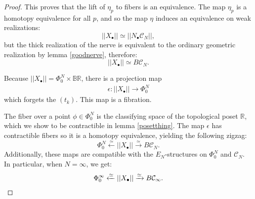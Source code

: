 \documentclass[10pt,a4paper]{amsart}
\newcommand{\C}{\mathcal{C}}
\DeclareMathOperator{\Conf}{Conf}
\DeclareMathOperator{\UConf}{UConf}
\begin{document}
\begin{proof}
This proves that the lift of $\eta_p$ to fibers is an equivalence.
The map $\eta_p$ is a homotopy equivalence for all $p$, and so the map $\eta$ induces an equivalence on weak realizations:
\[\vert\vert X_\bullet\vert\vert \simeq \vert\vert N_\bullet\C_N\vert\vert,\]
but the thick realization of the nerve is equivalent to the ordinary geometric realization by lemma \ref{goodnerve}, therefore:
\[\vert\vert X_\bullet\vert\vert \simeq B\C_N.\]

Because $\vert\vert X_\bullet\vert\vert = \Phi_0^N\times \mathbb{B}\mathbb{R}$, there is a projection map 
\begin{align}
\epsilon: \vert\vert X_\bullet\vert\vert\rightarrow \Phi_0^N 
\end{align}
which forgets the $(t_k)$.
This map is a fibration.

The fiber over a point $\phi\in\Phi_0^N$ is the classifying space of the topological poset $\mathbb{R}$, which we show to be contractible in lemma \ref{posetthing}.
The map $\epsilon$ has contractible fibers so it is a homotopy equivalence, yielding the following zigzag:
\[\Phi_0^N\xleftarrow{\simeq}\vert\vert X_\bullet\vert\vert \xrightarrow{\simeq} B\C_N.\]
Additionally, these maps are compatible with the $E_N$-structures on $\Phi_0^N$ and $\C_N$.
In particular, when $N=\infty$, we get:
\[\Phi_0^\infty\xleftarrow{\simeq}\vert\vert X_\bullet\vert\vert \xrightarrow{\simeq} B\C_\infty. \qedhere\]



\end{proof}
\end{document}

